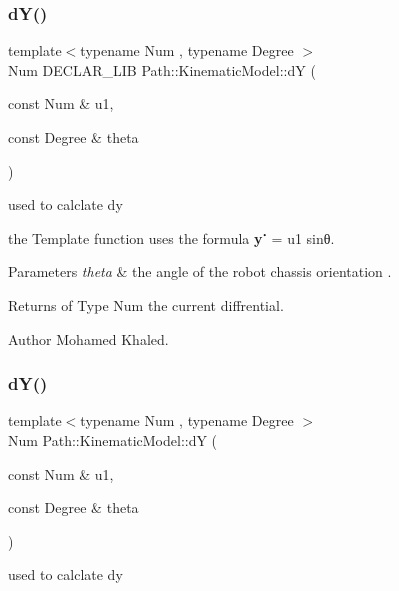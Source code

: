 \subsubsection{\texorpdfstring{d\+Y()}{dY()}\hspace{0.1cm}{\footnotesize\ttfamily [1/2]}}
{\footnotesize\ttfamily template$<$typename Num , typename Degree $>$ \\
Num D\+E\+C\+L\+A\+R\+\_\+\+L\+IB Path\+::\+Kinematic\+Model\+::dY (\begin{DoxyParamCaption}\item[{const Num \&}]{u1,  }\item[{const Degree \&}]{theta }\end{DoxyParamCaption})}



used to calclate dy 

the Template function uses the formula {\bfseries y˙} = u1 sinθ. 
\begin{DoxyParams}{Parameters}
{\em theta} & the angle of the robot chassis orientation . \\
\hline
\end{DoxyParams}
\begin{DoxyReturn}{Returns}
of Type Num the current diffrential. 
\end{DoxyReturn}
\begin{DoxyAuthor}{Author}
Mohamed Khaled. 
\end{DoxyAuthor}
\mbox{\label{namespace_path_1_1_kinematic_model_a7e6878ff0311921c9cbf53df0c866a04}} 
\subsubsection{\texorpdfstring{d\+Y()}{dY()}\hspace{0.1cm}{\footnotesize\ttfamily [2/2]}}
{\footnotesize\ttfamily template$<$typename Num , typename Degree $>$ \\
Num Path\+::\+Kinematic\+Model\+::dY (\begin{DoxyParamCaption}\item[{const Num \&}]{u1,  }\item[{const Degree \&}]{theta }\end{DoxyParamCaption})}



used to calclate dy 

